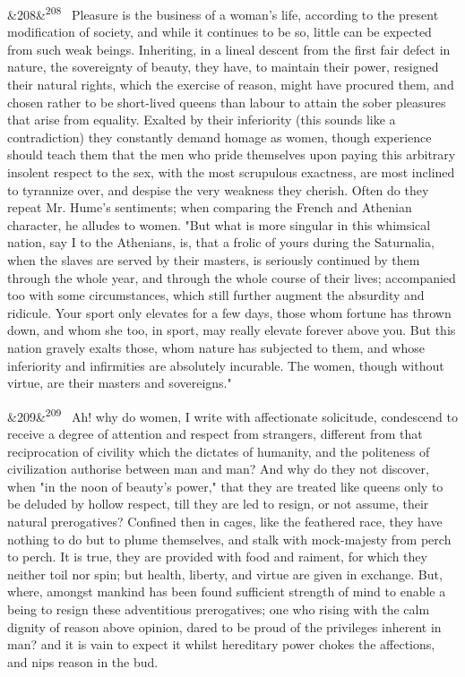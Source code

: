 \documentclass[12pt]{article}
\newcommand{\para}[1][]{\par\noindent\ifx&#1&\else\textsuperscript{\footnotesize #1}~\fi}
\begin{document}
\para[208] Pleasure is the business of a woman's life, according to the present modification of society, and while it continues to be so, little can be expected from such weak beings. Inheriting, in a lineal descent from the first fair defect in nature, the sovereignty of beauty, they have, to maintain their power, resigned their natural rights, which the exercise of reason, might have procured them, and chosen rather to be short-lived queens than labour to attain the sober pleasures that arise from equality. Exalted by their inferiority (this sounds like a contradiction) they constantly demand homage as women, though experience should teach them that the men who pride themselves upon paying this arbitrary insolent respect to the sex, with the most scrupulous exactness, are most inclined to tyrannize over, and despise the very weakness they cherish. Often do they repeat Mr. Hume's sentiments; when comparing the French and Athenian character, he alludes to women. "But what is more singular in this whimsical nation, say I to the Athenians, is, that a frolic of yours during the Saturnalia, when the slaves are served by their masters, is seriously continued by them through the whole year, and through the whole course of their lives; accompanied too with some circumstances, which still further augment the absurdity and ridicule. Your sport only elevates for a few days, those whom fortune has thrown down, and whom she too, in sport, may really elevate forever above you. But this nation gravely exalts those, whom nature has subjected to them, and whose inferiority and infirmities are absolutely incurable. The women, though without virtue, are their masters and sovereigns."

\para[209] Ah! why do women, I write with affectionate solicitude, condescend to receive a degree of attention and respect from strangers, different from that reciprocation of civility which the dictates of humanity, and the politeness of civilization authorise between man and man? And why do they not discover, when "in the noon of beauty's power," that they are treated like queens only to be deluded by hollow respect, till they are led to resign, or not assume, their natural prerogatives? Confined then in cages, like the feathered race, they have nothing to do but to plume themselves, and stalk with mock-majesty from perch to perch. It is true, they are provided with food and raiment, for which they neither toil nor spin; but health, liberty, and virtue are given in exchange. But, where, amongst mankind has been found sufficient strength of mind to enable a being to resign these adventitious prerogatives; one who rising with the calm dignity of reason above opinion, dared to be proud of the privileges inherent in man? and it is vain to expect it whilst hereditary power chokes the affections, and nips reason in the bud.
\end{document}
